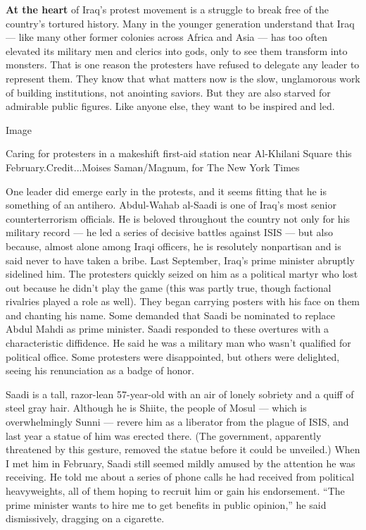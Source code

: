 \textbf{At the heart} of Iraq's protest movement is a struggle to break
free of the country's tortured history. Many in the younger generation
understand that Iraq --- like many other former colonies across Africa
and Asia --- has too often elevated its military men and clerics into
gods, only to see them transform into monsters. That is one reason the
protesters have refused to delegate any leader to represent them. They
know that what matters now is the slow, unglamorous work of building
institutions, not anointing saviors. But they are also starved for
admirable public figures. Like anyone else, they want to be inspired and
led.

Image

Caring for protesters in a makeshift first-aid station near Al-Khilani
Square this February.Credit...Moises Saman/Magnum, for The New York
Times

One leader did emerge early in the protests, and it seems fitting that
he is something of an antihero. Abdul-Wahab al-Saadi is one of Iraq's
most senior counterterrorism officials. He is beloved throughout the
country not only for his military record --- he led a series of decisive
battles against ISIS --- but also because, almost alone among Iraqi
officers, he is resolutely nonpartisan and is said never to have taken a
bribe. Last September, Iraq's prime minister abruptly sidelined him. The
protesters quickly seized on him as a political martyr who lost out
because he didn't play the game (this was partly true, though factional
rivalries played a role as well). They began carrying posters with his
face on them and chanting his name. Some demanded that Saadi be
nominated to replace Abdul Mahdi as prime minister. Saadi responded to
these overtures with a characteristic diffidence. He said he was a
military man who wasn't qualified for political office. Some protesters
were disappointed, but others were delighted, seeing his renunciation as
a badge of honor.

Saadi is a tall, razor-lean 57-year-old with an air of lonely sobriety
and a quiff of steel gray hair. Although he is Shiite, the people of
Mosul --- which is overwhelmingly Sunni --- revere him as a liberator
from the plague of ISIS, and last year a statue of him was erected
there. (The government, apparently threatened by this gesture, removed
the statue before it could be unveiled.) When I met him in February,
Saadi still seemed mildly amused by the attention he was receiving. He
told me about a series of phone calls he had received from political
heavyweights, all of them hoping to recruit him or gain his endorsement.
``The prime minister wants to hire me to get benefits in public
opinion,'' he said dismissively, dragging on a cigarette.

